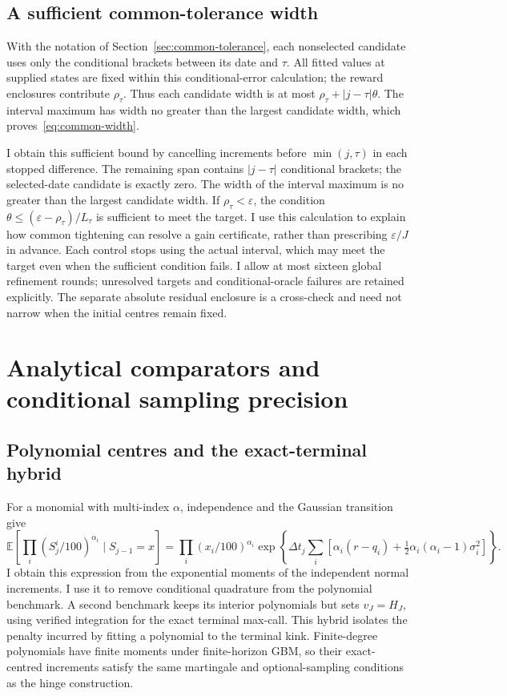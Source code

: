\documentclass[11pt]{article}
\newcommand{\E}{\mathbb E}
\begin{document}
\subsection{A sufficient common-tolerance width}
\label{app:common-width}

With the notation of Section~\ref{sec:common-tolerance}, each nonselected candidate uses only the conditional brackets between its date and $\tau$. All fitted values at supplied states are fixed within this conditional-error calculation; the reward enclosures contribute $\rho_\tau$. Thus each candidate width is at most $\rho_\tau+|j-\tau|\theta$. The interval maximum has width no greater than the largest candidate width, which proves~\eqref{eq:common-width}.

I obtain this sufficient bound by cancelling increments before $\min(j,\tau)$ in each stopped difference. The remaining span contains $|j-\tau|$ conditional brackets; the selected-date candidate is exactly zero. The width of the interval maximum is no greater than the largest candidate width. If $\rho_\tau<\varepsilon$, the condition $\theta\leq(\varepsilon-\rho_\tau)/L_\tau$ is sufficient to meet the target. I use this calculation to explain how common tightening can resolve a gain certificate, rather than prescribing $\varepsilon/J$ in advance. Each control stops using the actual interval, which may meet the target even when the sufficient condition fails. I allow at most sixteen global refinement rounds; unresolved targets and conditional-oracle failures are retained explicitly. The separate absolute residual enclosure is a cross-check and need not narrow when the initial centres remain fixed.

\section{Analytical comparators and conditional sampling precision}
\label{app:analytical-comparators}

\subsection{Polynomial centres and the exact-terminal hybrid}

For a monomial with multi-index $\alpha$, independence and the Gaussian transition give
\begin{equation}
 \E\!\left[\prod_i(S_j^i/100)^{\alpha_i}\mid S_{j-1}=x\right]
 =\prod_i(x_i/100)^{\alpha_i}
 \exp\!\left\{\Delta t_j\sum_i\left[\alpha_i(r-q_i)
       +\tfrac12\alpha_i(\alpha_i-1)\sigma_i^2\right]\right\}.
\label{eq:polynomialmoments}
\end{equation}
I obtain this expression from the exponential moments of the independent normal increments. I use it to remove conditional quadrature from the polynomial benchmark. A second benchmark keeps its interior polynomials but sets $v_J=H_J$, using verified integration for the exact terminal max-call. This hybrid isolates the penalty incurred by fitting a polynomial to the terminal kink. Finite-degree polynomials have finite moments under finite-horizon GBM, so their exact-centred increments satisfy the same martingale and optional-sampling conditions as the hinge construction.
\end{document}
